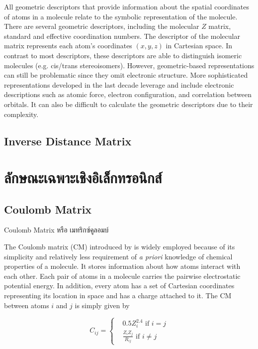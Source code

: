 All geometric descriptors that provide information about the spatial coordinates of atoms in 
a molecule relate to the symbolic representation of the molecule. There are several geometric descriptors, 
including the molecular $Z$ matrix, standard and effective coordination numbers. 
The descriptor of the molecular matrix represents each atom's coordinates $(x, y, z)$ in Cartesian space. 
In contrast to most descriptors, these descriptors are able to distinguish isomeric molecules 
(e.g. cis/trans stereoisomers). However, geometric-based representations can still be problematic 
since they omit electronic structure. More sophisticated representations developed in 
the last decade leverage and include electronic descriptions such as atomic force, electron configuration, 
and correlation between orbitals.\cite{musil2021} It can also be difficult to calculate 
the geometric descriptors due to their complexity.\cite{keith2021}

\subsection{Inverse Distance Matrix}

\section{ลักษณะเฉพาะเชิงอิเล็กทรอนิกส์}

\subsection{Coulomb Matrix}

Coulomb Matrix หรือ เมทริกซ์คูลอมบ์

The Coulomb matrix (CM) introduced by \citeauthor{rupp2012} is widely employed because of its simplicity 
and relatively less requirement of \textit{a priori} knowledge of chemical properties of a molecule.\cite{rupp2012}
It stores information about how atoms interact with each other. Each pair of atoms in a molecule carries 
the pairwise electrostatic potential energy. In addition, every atom has a set of Cartesian coordinates 
representing its location in space and has a charge attached to it. The CM between atoms $i$ and $j$ 
is simply given by

\begin{equation}
C_{ij} =
\begin{cases}
 & 0.5 Z_i^{2.4} \text{ if } i = j \\ 
 & \frac{Z_i Z_j}{R_{ij}} \text{ if } i \neq j
\end{cases}
\end{equation}

